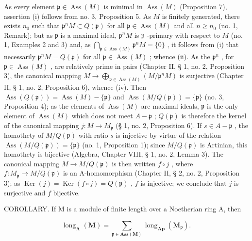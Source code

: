 As every element \(\mathfrak{p} \in \operatorname{Ass}(M)\) is minimal in \(\operatorname{Ass}(M)\) (Proposition 7), assertion (i) follows from no. 3, Proposition 5. As \(M\) is finitely generated, there exists \(n_0\) such that \(\mathfrak{p}^n M \subset Q(\mathfrak{p})\) for all \(\mathfrak{p} \in \operatorname{Ass}(M)\) and all \(n \geqslant n_0\) (no. 1, Remark); but as \(\mathfrak{p}\) is a maximal ideal, \(\mathfrak{p}^n M\) is \(\mathfrak{p}\) -primary with respect to \(M\) (no. 1, Examples 2 and 3) and, as \(\bigcap_{\mathfrak{p} \in \operatorname{Ass}(M)} \mathfrak{p}^n M = \{0\}\) , it follows from (i) that necessarily \(\mathfrak{p}^n M = Q(\mathfrak{p})\) for all \(\mathfrak{p} \in \operatorname{Ass}(M)\) ; whence (ii). As the \(\mathfrak{p}^n\) , for \(\mathfrak{p} \in \operatorname{Ass}(M)\) , are relatively prime in pairs (Chapter II, § 1, no. 2, Proposition 3), the canonical mapping \(M \to \bigoplus_{\mathfrak{p} \in \operatorname{Ass}(M)} (M / \mathfrak{p}^n M)\) is surjective (Chapter II, § 1, no. 2, Proposition 6), whence (iv). Then \(\operatorname{Ass}(Q(\mathfrak{p})) = \operatorname{Ass}(M) - \{\mathfrak{p}\}\) and \(\operatorname{Ass}(M / Q(\mathfrak{p})) = \{\mathfrak{p}\}\) (no. 3, Proposition 4); as the elements of \(\operatorname{Ass}(M)\) are maximal ideals, \(\mathfrak{p}\) is the only element of \(\operatorname{Ass}(M)\) which does not meet \(A - \mathfrak{p}\) ; \(Q(\mathfrak{p})\) is therefore the kernel of the canonical mapping \(j: M \to M_{\mathfrak{p}}\) (§ 1, no. 2, Proposition 6). If \(s \in A - \mathfrak{p}\) , the homothety of \(M / Q(\mathfrak{p})\) with ratio \(s\) is injective by virtue of the relation \(\operatorname{Ass}(M / Q(\mathfrak{p})) = \{\mathfrak{p}\}\) (no. 1, Proposition 1); since \(M / Q(\mathfrak{p})\) is Artinian, this homothety is bijective (Algebra, Chapter VIII, § 1, no. 2, Lemma 3). The canonical mapping \(M \to M / Q(\mathfrak{p})\) is then written \(f \circ j\) , where \(f: M_{\mathfrak{p}} \to M / Q(\mathfrak{p})\) is an A-homomorphism (Chapter II, § 2, no. 2, Proposition 3); as \(\operatorname{Ker}(j) = \operatorname{Ker}(f \circ j) = Q(\mathfrak{p})\) , \(f\) is injective; we conclude that \(j\) is surjective and \(f\) bijective.

COROLLARY. If M is a module of finite length over a Noetherian ring A, then

\[
\operatorname{long} _ {\mathbf {A}} (\mathbf {M}) = \sum_ {\mathfrak {p} \in \mathbf {A s s} (\mathbf {M})} \operatorname{long} _ {\mathbf {A p}} (\mathbf {M} _ {\mathfrak {p}}).\tag{4}
\]


